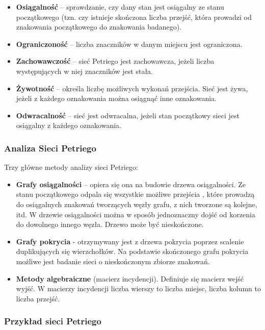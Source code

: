 \begin{itemize}
	\item \textbf{Osiągalność} – sprawdzanie, czy dany stan jest osiągalny ze stanu początkowego (tzn. czy istnieje skończona liczba przejść, która prowadzi od znakowania początkowego do znakowania badanego).
	\item \textbf{Ograniczoność} – liczba znaczników w danym miejscu jest ograniczona.
	\item \textbf{Zachowawczość} – sieć Petriego jest zachowawcza, jeżeli liczba występujących w niej znaczników jest stała.
	\item \textbf{Żywotność} – określa liczbę możliwych wykonań przejścia. Sieć jest żywa, jeżeli z każdego oznakowania można osiągnąć inne oznakowania.
	\item \textbf{Odwracalność} – sieć jest odwracalna, jeżeli stan początkowy sieci jest osiągalny z każdego oznakowania.
\end{itemize}

\subsubsection{Analiza Sieci Petriego}

Trzy główne metody analizy sieci Petriego:

\begin{itemize}
	\item \textbf{Grafy osiągalności} – opiera się ona na budowie drzewa osiągalności. Ze stanu początkowego odpala się wszystkie możliwe przejścia , które prowadzą do osiągalnych znakowań tworzących węzły grafu, z nich tworzone są kolejne, itd. W drzewie osiągalności można w sposób jednoznaczny dojść od korzenia do dowolnego innego węzła. Drzewo może być nieskończone.
	\item \textbf{Grafy pokrycia} - otrzymywany jest z drzewa pokrycia poprzez scalenie duplikujących się wierzchołków. Na podstawie skończonego grafu pokrycia możliwe jest badanie sieci o nieskończonym zbiorze znakowań.
	\item \textbf{Metody algebraiczne} (macierz incydencji). Definiuje się macierz wejść wyjść. W macierzy incydencji liczba wierszy to liczba miejsc, liczba kolumn to liczba przejść.
\end{itemize}

\subsubsection{Przykład sieci Petriego}

